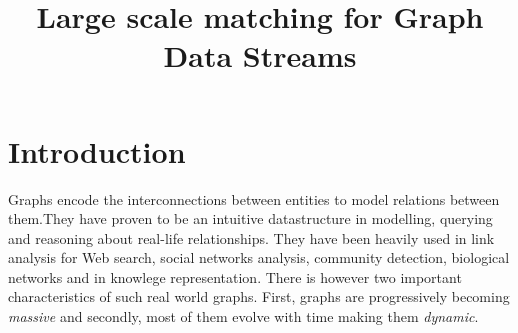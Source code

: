 \documentclass{scrartcl}
\begin{document}
  
 \title{Large scale matching for Graph Data Streams}
 \maketitle

\section{Introduction}
Graphs encode the interconnections between entities to model relations between them.They have proven to be an intuitive datastructure in modelling, querying and reasoning about real-life relationships. They have been heavily used in link analysis for Web search, social networks analysis, community detection, biological networks and in knowlege representation. There is however two important characteristics of such real world graphs. First, graphs are progressively becoming \emph{massive} and secondly, most of them evolve with time making them \emph{dynamic}.


%


\end{document}
